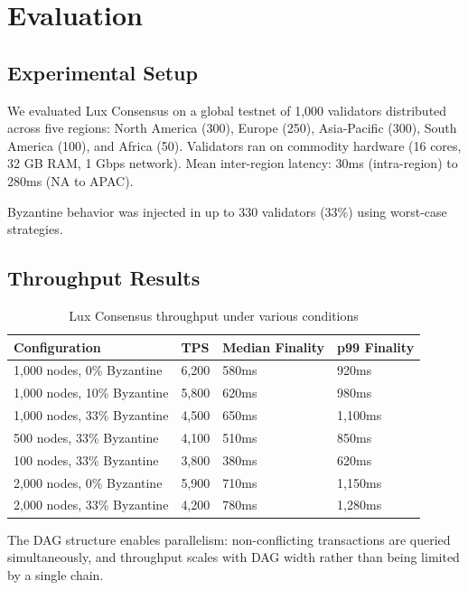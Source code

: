 \section{Evaluation}

\label{sec:evaluation}

\subsection{Experimental Setup}

We evaluated Lux Consensus on a global testnet of 1,000 validators distributed across
five regions: North America (300), Europe (250), Asia-Pacific (300),
South America (100), and Africa (50). Validators ran on commodity hardware (16 cores,
32 GB RAM, 1 Gbps network). Mean inter-region latency: 30ms (intra-region)
to 280ms (NA to APAC).

Byzantine behavior was injected in up to 330 validators (33\%) using worst-case strategies.

\subsection{Throughput Results}

\begin{table}[h]
\centering
\caption{Lux Consensus throughput under various conditions}
\label{tab:throughput}
\begin{tabular}{@{}llll@{}}
\toprule
Configuration & TPS & Median Finality & p99 Finality \\
\midrule
1,000 nodes, 0\% Byzantine & 6,200 & 580ms & 920ms \\
1,000 nodes, 10\% Byzantine & 5,800 & 620ms & 980ms \\
1,000 nodes, 33\% Byzantine & 4,500 & 650ms & 1,100ms \\
500 nodes, 33\% Byzantine & 4,100 & 510ms & 850ms \\
100 nodes, 33\% Byzantine & 3,800 & 380ms & 620ms \\
2,000 nodes, 0\% Byzantine & 5,900 & 710ms & 1,150ms \\
2,000 nodes, 33\% Byzantine & 4,200 & 780ms & 1,280ms \\
\bottomrule
\end{tabular}
\end{table}

The DAG structure enables parallelism: non-conflicting transactions are queried simultaneously,
and throughput scales with DAG width rather than being limited by a single chain.

